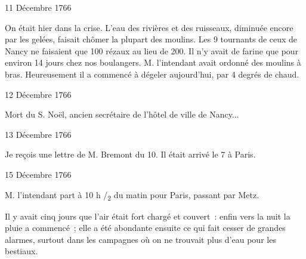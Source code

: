                      \begin{diary}{11 Décembre 1766}{}
                        
                         On était hier dans la
                           crise. L’eau des
                           rivières et des ruisseaux, diminuée encore
                           par les gelées, faisait chômer la plupart
                           des moulins. Les 9 tournants de ceux de
                           Nancy ne faisaient que 100 rézaux au lieu
                           de 200. Il n’y avait de farine que pour
                           environ 14 jours chez nos boulangers.
                           M. l’intendant avait
                           ordonné des moulins
                           à bras. Heureusement il a commencé à
                           dégeler aujourd'hui, par 4 degrés de chaud. \bigskip
        
        
                     \end{diary}

                     \begin{diary}{12 Décembre 1766}{}
                        
                         Mort du S.
                              Noël, ancien secrétaire de
                           l’hôtel de ville de Nancy... \bigskip
        
        
                     \end{diary}

                     \begin{diary}{13 Décembre 1766}{}
                        
                         Je reçois une lettre de M.
                              Bremont du 10. Il
                           était arrivé le 7 à Paris. \bigskip
        
        
                     \end{diary}
                     

                     \begin{diary}{15 Décembre 1766}{}
                        
                        
                           M. l’intendant part à 10 h /\textsubscript{2} du matin
                           pour Paris, passant par
                              Metz. \bigskip
        
        
                         Il y avait cinq jours que l’air
                           était fort chargé
                           et couvert : enfin vers la nuit la pluie a
                           commencé ; elle a été abondante ensuite
                           ce qui fait cesser de grandes alarmes, surtout
                           dans les campagnes où on ne trouvait plus
                           d’eau pour les bestiaux. \bigskip
        
        
                     \end{diary}

